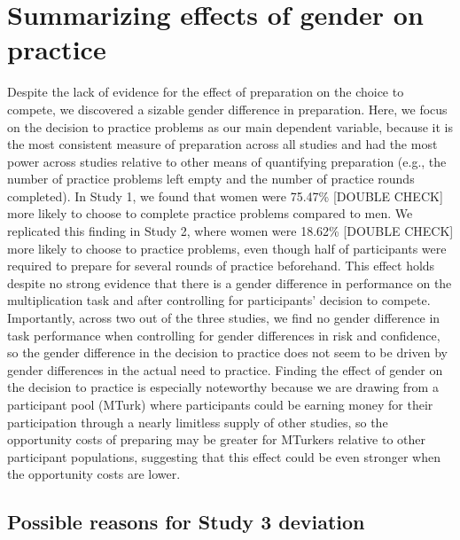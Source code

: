 \documentclass[a4paper, nobind]{templates/ociamthesis}
\begin{document}
\hypertarget{summarizing-effects-of-gender-on-practice}{%
\section{Summarizing effects of gender on practice}\label{summarizing-effects-of-gender-on-practice}}

Despite the lack of evidence for the effect of preparation on the choice to compete, we discovered a sizable gender difference in preparation. Here, we focus on the decision to practice problems as our main dependent variable, because it is the most consistent measure of preparation across all studies and had the most power across studies relative to other means of quantifying preparation (e.g., the number of practice problems left empty and the number of practice rounds completed). In Study 1, we found that women were 75.47\% {[}DOUBLE CHECK{]} more likely to choose to complete practice problems compared to men. We replicated this finding in Study 2, where women were 18.62\% {[}DOUBLE CHECK{]} more likely to choose to practice problems, even though half of participants were required to prepare for several rounds of practice beforehand. This effect holds despite no strong evidence that there is a gender difference in performance on the multiplication task and after controlling for participants' decision to compete. Importantly, across two out of the three studies, we find no gender difference in task performance when controlling for gender differences in risk and confidence, so the gender difference in the decision to practice does not seem to be driven by gender differences in the actual need to practice. Finding the effect of gender on the decision to practice is especially noteworthy because we are drawing from a participant pool (MTurk) where participants could be earning money for their participation through a nearly limitless supply of other studies, so the opportunity costs of preparing may be greater for MTurkers relative to other participant populations, suggesting that this effect could be even stronger when the opportunity costs are lower.

\hypertarget{possible-reasons-for-study-3-deviation}{%
\subsection{Possible reasons for Study 3 deviation}\label{possible-reasons-for-study-3-deviation}}
\end{document}
